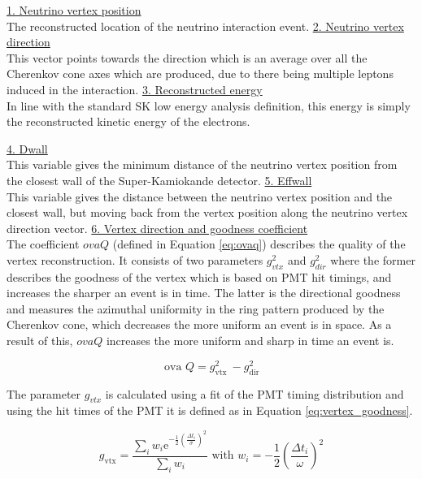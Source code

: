 \noindent
\underline{1. Neutrino vertex position}\\
\noindent 
The reconstructed location of the neutrino interaction event.
\newline
\noindent
\underline{2. Neutrino vertex direction}\\
\noindent
This vector points towards the direction which is an average over all the Cherenkov cone axes which are produced, due to there being multiple leptons induced in the interaction.
\newline
\noindent
\underline{3. Reconstructed energy}\\
\noindent 
In line with the standard SK low energy analysis definition, this energy is simply the reconstructed kinetic energy of the electrons. 

\noindent
\underline{4. Dwall}\\
\noindent 
This variable gives the minimum distance of the neutrino vertex position from the closest wall of the Super-Kamiokande detector.
\newline
\noindent
\underline{5. Effwall}\\
\noindent 
This variable gives the distance between the neutrino vertex position and the closest wall, but moving back from the vertex position along the neutrino vertex direction vector.\hfill \break
\newline
\noindent
\underline{6. Vertex direction and goodness coefficient}\\
\noindent 
The coefficient $ovaQ$ (defined in Equation \ref{eq:ovaq}) describes the quality of the vertex reconstruction. It consists of two parameters $g^2_{vtx}$ and $g^2_{dir}$ where the former describes the goodness of the vertex which is based on PMT hit timings, and increases the sharper an event is in time. The latter is the directional goodness and measures the azimuthal uniformity in the ring pattern produced by the Cherenkov cone, which decreases the more uniform an event is in space. As a result of this, $ovaQ$ increases the more uniform and sharp in time an event is.

\begin{equation}
    \text { ova } Q=g_{\text {vtx }}^{2}-g_{\text {dir }}^{2}
    \label{eq:ovaq}
\end{equation}

The parameter $g_{vtx}$ is calculated using a fit of the PMT timing distribution and using the hit times of the PMT it is defined as in Equation \ref{eq:vertex_goodness}.

\begin{equation}
g_{\mathrm{vtx}}=\frac{\sum_{i} w_{i} \mathrm{e}^{-\frac{1}{2}(\frac{\Delta t_{i}}{\sigma})^{2}}}{\sum_{i} w_{i}} \text { with } w_{i}=-\frac{1}{2}(\frac{\Delta t_{i}}{\omega})^{2}
\label{eq:vertex_goodness}
\end{equation}

